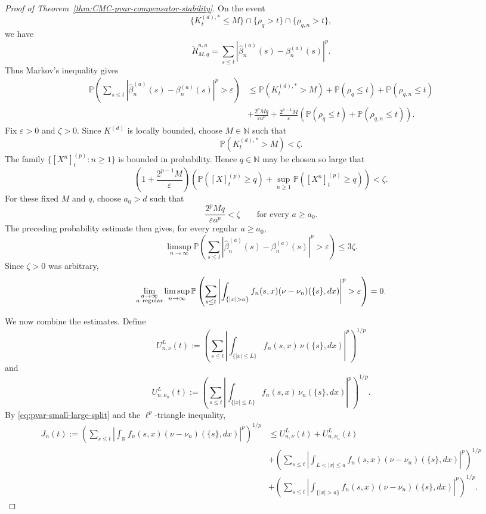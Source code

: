 \documentclass[a4paper,10pt]{article}
\renewcommand{\P}{\mathbb P}
\begin{document}
\begin{proof}[Proof of Theorem~\ref{thm:CMC-pvar-compensator-stability}]
On the event
\[
        \{K_t^{(d),*}\le M\}
        \cap
        \{\rho_q>t\}
        \cap
        \{\rho_{q,n}>t\},
\]
we have
\[
\widetilde R_{M,q}^{n,a}
=
\sum_{s\le t}
\left|
\widehat\beta_n^{(a)}(s)-\beta_n^{(a)}(s)
\right|^p.
\]
Thus Markov's inequality gives
\[
\begin{aligned}
\P\left(
\sum_{s\le t}
\left|
\widehat\beta_n^{(a)}(s)-\beta_n^{(a)}(s)
\right|^p
>\varepsilon
\right)
&\le
\P(K_t^{(d),*}>M)
+
\P(\rho_q\le t)
+
\P(\rho_{q,n}\le t)
\\
&+
\frac{2^pMq}{\varepsilon a^p}
+
\frac{2^{p-1}M}{\varepsilon}
\left(
\P(\rho_q\le t)
+
\P(\rho_{q,n}\le t)
\right).
\end{aligned}
\]
Fix \(\varepsilon>0\) and \(\zeta>0\). Since \(K^{(d)}\) is locally
bounded, choose \(M\in\mathbb N\) such that
\[
        \P(K_t^{(d),*}>M)<\zeta.
\]
The family
$
        \{[X^n]^{(p)}_t:n\ge1\}
$
is bounded in probability. Hence \(q\in\mathbb N\) may be chosen so
large that
\[
\left(
1+\frac{2^{p-1}M}{\varepsilon}
\right)
\left(
\P([X]^{(p)}_t\ge q)
+
\sup_{n\ge1}\P([X^n]^{(p)}_t\ge q)
\right)
<
\zeta.
\]
For these fixed \(M\) and \(q\), choose \(a_0>d\) such that
\[
        \frac{2^pMq}{\varepsilon a^p}<\zeta
        \qquad\text{for every }a\ge a_0.
\]
The preceding probability estimate then gives, for every regular
\(a\ge a_0\),
\[
\limsup_{n\to\infty}
\P\left(
\sum_{s\le t}
\left|
\widehat\beta_n^{(a)}(s)-\beta_n^{(a)}(s)
\right|^p
>
\varepsilon
\right)
\le
3\zeta.
\]
Since \(\zeta>0\) was arbitrary,
\begin{equation}
\lim_{\substack{a\to\infty\\a\ {\rm regular}}}
\limsup_{n\to\infty}
\P\left(
\sum_{s\le t}
\left|
\int_{\{|x|>a\}}
f_n(s,x)(\nu-\nu_n)(\{s\},dx)
\right|^p
>
\varepsilon
\right)
=
0.
\label{eq:pvar-tail-limsup}
\end{equation}

We now combine the estimates. Define
\[
U_{n,\nu}^{L}(t)
:=
\left(
\sum_{s\le t}
\left|
\int_{\{|x|\le L\}}
f_n(s,x)\,\nu(\{s\},dx)
\right|^p
\right)^{1/p}
\]
and
\[
U_{n,\nu_n}^{L}(t)
:=
\left(
\sum_{s\le t}
\left|
\int_{\{|x|\le L\}}
f_n(s,x)\,\nu_n(\{s\},dx)
\right|^p
\right)^{1/p}.
\]
By \eqref{eq:pvar-small-large-split} and the
\(\ell^p\)-triangle inequality,
\begin{align}
J_n(t)
:=
\left(
\sum_{s\le t}
\left|
\int_{\mathbb R}
f_n(s,x)(\nu-\nu_n)(\{s\},dx)
\right|^p
\right)^{1/p}
&\le
U_{n,\nu}^{L}(t)
+
U_{n,\nu_n}^{L}(t)
\nonumber\\
&+
\left(
\sum_{s\le t}
\left|
\int_{L<|x|\le a}
f_n(s,x)(\nu-\nu_n)(\{s\},dx)
\right|^p
\right)^{1/p}
\nonumber\\
&+
\left(
\sum_{s\le t}
\left|
\int_{\{|x|>a\}}
f_n(s,x)(\nu-\nu_n)(\{s\},dx)
\right|^p
\right)^{1/p}.
\label{eq:pvar-final-four-term-decomposition}
\end{align}


\end{proof}
\end{document}

